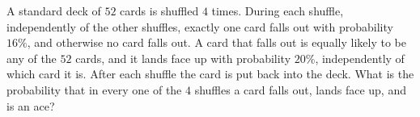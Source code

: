 A standard deck of $52$ cards is shuffled $4$ times. During each shuffle, independently of the other shuffles, exactly one card falls out with probability $16\%$, and otherwise no card falls out. A card that falls out is equally likely to be any of the $52$ cards, and it lands face up with probability $20\%$, independently of which card it is. After each shuffle the card is put back into the deck. What is the probability that in every one of the $4$ shuffles a card falls out, lands face up, and is an ace?
